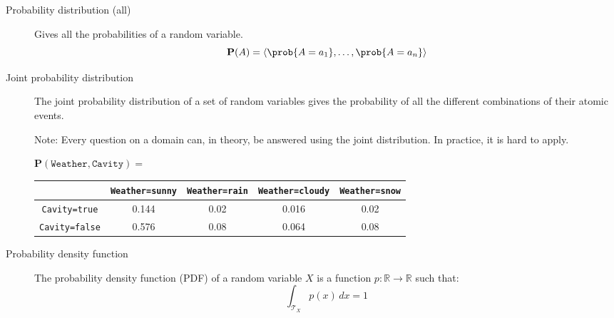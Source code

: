 \begin{description}
    \item[Probability distribution (all)] 
        Gives all the probabilities of a random variable.
        \[ \textbf{P}(A) = \langle \prob{A=a_1}, \dots, \prob{A=a_n} \rangle \]
    
    \item[Joint probability distribution] 
        The joint probability distribution of a set of random variables gives 
        the probability of all the different combinations of their atomic events.

        Note: Every question on a domain can, in theory, be answered using the joint distribution.
        In practice, it is hard to apply.

        \begin{example}
            $\textbf{P}(\texttt{Weather}, \texttt{Cavity}) = $
            \begin{center}
                \small
                \begin{tabular}{c | cccc}
                                            & \texttt{Weather=sunny} & \texttt{Weather=rain} & \texttt{Weather=cloudy} & \texttt{Weather=snow} \\
                    \hline
                    \texttt{Cavity=true}    & 0.144 & 0.02 & 0.016 & 0.02 \\
                    \texttt{Cavity=false}   & 0.576 & 0.08 & 0.064 & 0.08
                \end{tabular}
            \end{center}
        \end{example}

    \item[Probability density function] 
        The probability density function (PDF) of a random variable $X$ is a function $p: \mathbb{R} \rightarrow \mathbb{R}$
        such that:
        \[ \int_{\mathcal{T}_X} p(x) \,dx = 1 \]
\end{description}
